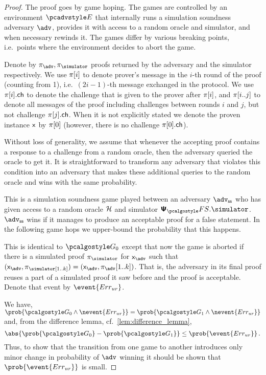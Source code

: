\documentclass[runningheads,11pt]{llncs}
\begin{document}
\begin{proof}
    The proof goes by game hoping. The games are controlled by an environment
  $\env$ that internally runs a simulation soundness adversary $\adv$,
  provides it with access to a random oracle and simulator, and when necessary
  rewinds it. The games differ by various breaking points, i.e.~points where the
  environment decides to abort the game.

  Denote by $\zkproof_{\adv}, \zkproof_{\simulator}$ proofs returned by the
  adversary and the simulator respectively. We use $\pi[i]$ to denote
  prover's message in the $i$-th round of the proof (counting from 1), i.e.~$(2i
  - 1)$-th message exchanged in the protocol. We use $\pi[i].\mathsf{ch}$ to denote the
  challenge that is given to the prover after $\pi[i]$, and
  $\pi[i..j]$ to denote all messages of the proof including challenges
  between rounds $i$ and $j$, but not challenge $\pi[j].\mathsf{ch}$. When it is
  not explicitly stated we denote the proven instance $\mathsf{x}$ by $\pi[0]$
  (however, there is no challenge $\pi[0].\mathsf{ch}$).

  Without loss of generality, we assume that whenever the accepting proof
  contains a response to a challenge from a random oracle, then the
  adversary queried the oracle to get it. It is straightforward to transform any
  adversary that violates this condition into an adversary that makes these
  additional queries to the random oracle and wins with the same probability.

   This is a simulation soundness game played between an adversary
  $\advss$ who has given access to a random oracle $\mathcal{H}$ and simulator
  $\psfs.\simulator$. $\advss$ wins if it manages to produce an acceptable proof
  for a false statement. In the following game hops we upper-bound the
  probability that this happens.

   This is identical to $\game{0}$ except that now the game is aborted
  if there is a simulated proof $\zkproof_\simulator$ for $\inp_{\adv}$ such
  that $(\inp_{\adv}, \zkproof_\simulator[1..k]) = (\inp_{\adv},
  \zkproof_{\adv}[1..k])$. That is, the adversary in its final proof
  reuses a part of a simulated proof it saw before and the proof is acceptable.
  Denote that event by $\event{\errur}$.

   We have, \( \prob{\game{0} \land
    \nevent{\errur}} = \prob{\game{1} \land \nevent{\errur}} \) and, from the
  difference lemma, cf.~\cref{lem:difference_lemma},
  \[ \abs{\prob{\game{0}} - \prob{\game{1}}} \leq \prob{\event{\errur}}\,. \]
  Thus, to show that the transition from one game to another introduces only
  minor change in probability of $\adv$ winning it should be shown that
  $\prob{\event{\errur}}$ is small.


\end{proof}
\end{document}
